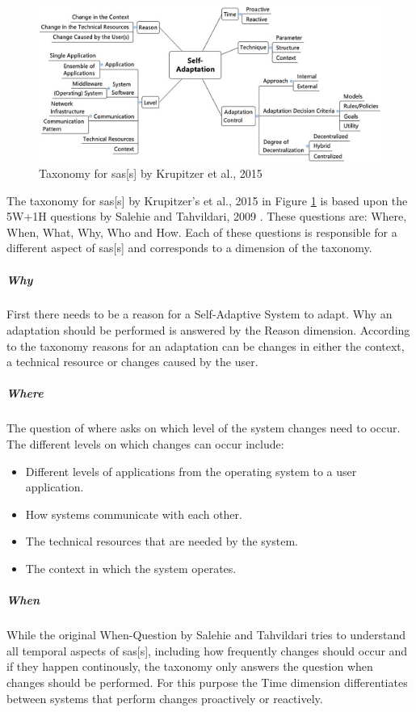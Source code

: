 \begin{figure}[t!]
    \includegraphics[width=\textwidth]{images/KrupitzerTaxonomy.jpg}
    \caption{Taxonomy for \acrlong{sas}[s] by Krupitzer et al., 2015 \cite*{SurveyOnEngineeringApproaches}}
    \label{fig:KrupitzerTaxonomy}
\end{figure}

\noindent The taxonomy for \acrlong{sas}[s] by Krupitzer's et al., 2015 \cite*{SurveyOnEngineeringApproaches} in Figure \ref{fig:KrupitzerTaxonomy}
is based upon the 5W+1H questions by Salehie and Tahvildari, 2009 \cite*{LandscapeAndResearchChallenges}.
These questions are: Where, When, What, Why, Who and How.
Each of these questions is responsible for a different aspect of \acrlong{sas}[s] and corresponds to a dimension of the taxonomy.

\subparagraph*{Why}
First there needs to be a reason for a Self-Adaptive System to adapt. Why an adaptation should be performed is answered by the Reason dimension.
According to the taxonomy reasons for an adaptation can be changes in either the context, a technical resource or changes caused by the user.

\subparagraph*{Where}
The question of where asks on which level of the system changes need to occur.
The different levels on which changes can occur include:
\begin{itemize}[nosep]
    \item Different levels of applications from the operating system to a user application.
    \item How systems communicate with each other.
    \item The technical resources that are needed by the system.
    \item The context in which the system operates.
\end{itemize}

\subparagraph*{When}
While the original When-Question by Salehie and Tahvildari tries to understand all temporal aspects of \acrlong{sas}[s],
including how frequently changes should occur and if they happen continously,
the taxonomy only answers the question when changes should be performed.
For this purpose the Time dimension differentiates between systems that perform changes proactively or reactively.

